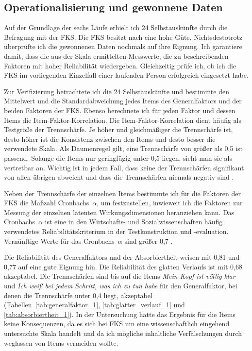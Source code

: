 \subsection{Operationalisierung und gewonnene Daten} 

\label{sub:operationalisierung_und_gewonnene_daten}

Auf der Grundlage der sechs Läufe erhielt ich 24 Selbstauskünfte durch die Befragung mit der \ac{FKS}. Die \ac{FKS} besitzt nach \citet{Rheinberg2003} eine hohe Güte. Nichtsdestotrotz überprüfte ich die gewonnenen Daten nochmals auf ihre Eignung. Ich garantiere damit, dass die aus der Skala ermittelten Messwerte, die zu beschreibenden Faktoren mit hoher Reliabilität wiedergeben. Gleichzeitig prüfe ich, ob ich die \ac{FKS} im vorliegenden Einzelfall einer laufenden Person erfolgreich eingesetzt habe.

Zur Verifizierung betrachtete ich die 24 Selbstauskünfte und bestimmte den Mittelwert und die Standardabweichung jedes Items des Generalfaktors und der beiden Faktoren der \ac{FKS}. Ebenso berechnete ich für jeden Faktor und dessen Items die Item-Faktor-Korrelation. Die Item-Faktor-Korrelation dient häufig als Testgröße der Trennschärfe. Je höher und gleichmäßiger die Trennschärfe ist, desto höher ist die Konsistenz zwischen den Items und desto besser die verwendete Skala. Als Daumenregel gilt, eine Trennschärfe von größer als 0,5 ist passend. Solange die Items nur geringfügig unter 0,5 liegen, sieht man sie als vertretbar an. Wichtig ist in jedem Fall, dass keine der Trennschärfen signifikant von allen übrigen abweicht und dass die Trennschärfen niemals negativ sind \citep[][S.~219f.]{Bortz2006}.

Neben der Trennschärfe der einzelnen Items bestimmte ich für die Faktoren der \ac{FKS} die Maßzahl Cronbachs~$\alpha$, um festzustellen, inwieweit ich die Faktoren zur Messung der einzelnen latenten Wirkungsdimensionen heranziehen kann. Das Cronbachs~$\alpha$ ist eine in den Wirtschafts- und Sozialwissenschaften häufig verwendetes Reliabilitätskriterium in der Testkonstruktion und -evaluation. Vernünftige Werte für das Cronbachs~$\alpha$ sind größer 0,7 \citep[][S.~189f.]{Bortz2006}.

Die Reliabilität des Generalfaktors und der Absorbiertheit weisen mit 0,81 und 0,77 auf eine gute Eignung hin. Die Reliabilität des glatten Verlaufs ist mit 0,68 akzeptabel. Die Trennschärfen sind bis auf die Items \emph{Mein Kopf ist völlig klar} und \emph{Ich weiß bei jedem Schritt, was ich zu tun habe} für den Generalfaktor, bei denen die Trennschärfe unter 0,4 liegt, akzeptabel (Tabellen~\ref{tab:generalfaktor_1}, \ref{tab:glatter_verlauf_1} und \ref{tab:absorbiertheit_1}). In der Untersuchung hatte das Ergebnis für die Items keine Konsequenzen, da es sich bei \ac{FKS} um eine wissenschaftlich eingehend untersuchte Skala handelt und da ich mögliche inhaltliche Verfälschungen durch weglassen von Items vermeiden wollte.

